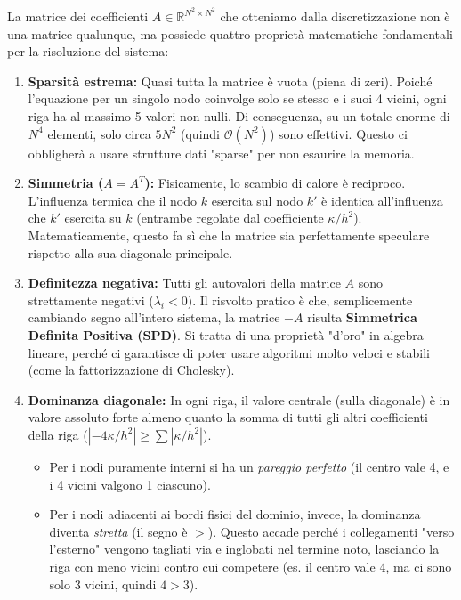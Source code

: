 \documentclass[a4paper,11pt]{article}
\theoremstyle{definition}
\begin{document}
\begin{tcolorbox}[concetto]
La matrice dei coefficienti $A \in \mathbb{R}^{N^2 \times N^2}$ che otteniamo dalla discretizzazione non è una matrice qualunque, ma possiede quattro proprietà matematiche fondamentali per la risoluzione del sistema:
\begin{enumerate}
  \item \textbf{Sparsità estrema:} Quasi tutta la matrice è vuota (piena di zeri). Poiché l'equazione per un singolo nodo coinvolge solo se stesso e i suoi 4 vicini, ogni riga ha al massimo 5 valori non nulli. Di conseguenza, su un totale enorme di $N^4$ elementi, solo circa $5N^2$ (quindi $\mathcal{O}(N^2)$) sono effettivi. Questo ci obbligherà a usare strutture dati "sparse" per non esaurire la memoria.
  
  \item \textbf{Simmetria ($A = A^T$):} Fisicamente, lo scambio di calore è reciproco. L'influenza termica che il nodo $k$ esercita sul nodo $k'$ è identica all'influenza che $k'$ esercita su $k$ (entrambe regolate dal coefficiente $\kappa/h^2$). Matematicamente, questo fa sì che la matrice sia perfettamente speculare rispetto alla sua diagonale principale.
  
  \item \textbf{Definitezza negativa:} Tutti gli autovalori della matrice $A$ sono strettamente negativi ($\lambda_i < 0$). Il risvolto pratico è che, semplicemente cambiando segno all'intero sistema, la matrice $-A$ risulta \textbf{Simmetrica Definita Positiva (SPD)}. Si tratta di una proprietà "d'oro" in algebra lineare, perché ci garantisce di poter usare algoritmi molto veloci e stabili (come la fattorizzazione di Cholesky).
  
  \item \textbf{Dominanza diagonale:} In ogni riga, il valore centrale (sulla diagonale) è in valore assoluto forte almeno quanto la somma di tutti gli altri coefficienti della riga ($|-4\kappa/h^2| \ge \sum |\kappa/h^2|$). 
  \begin{itemize}
      \item Per i nodi puramente interni si ha un \emph{pareggio perfetto} (il centro vale 4, e i 4 vicini valgono 1 ciascuno). 
      \item Per i nodi adiacenti ai bordi fisici del dominio, invece, la dominanza diventa \emph{stretta} (il segno è $>$). Questo accade perché i collegamenti "verso l'esterno" vengono tagliati via e inglobati nel termine noto, lasciando la riga con meno vicini contro cui competere (es. il centro vale 4, ma ci sono solo 3 vicini, quindi $4 > 3$).
  \end{itemize}
\end{enumerate}
\end{tcolorbox}
\end{document}
